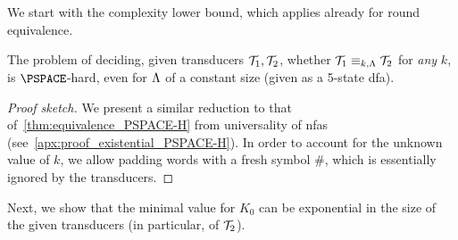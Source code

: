 We start with the complexity lower bound, which applies already for round equivalence.

\begin{theorem}
\label{thm:existential_equivalence_PSPACE-H}
The problem of deciding, given transducers $\mathcal{T}_1,\mathcal{T}_2$, whether $\mathcal{T}_1\equiv_{k,\Lambda} \mathcal{T}_2$ for \emph{any} $k$, is $\PSPACE$-hard, even for $\Lambda$ of a constant size (given as a 5-state \gls{dfa}).
\end{theorem}
\begin{proof}[Proof sketch]
We present a similar reduction to that of~\cref{thm:equivalence_PSPACE-H} from universality of \glspl{nfa} (see~\cref{apx:proof_existential_PSPACE-H}). In order to account for the unknown value of $k$, we allow padding words with a fresh symbol $\#$, which is essentially ignored by the transducers. 
\end{proof}

Next, we show that the minimal value for $K_0$ can be exponential in the size of the given transducers (in particular, of $\mathcal{T}_2$).

